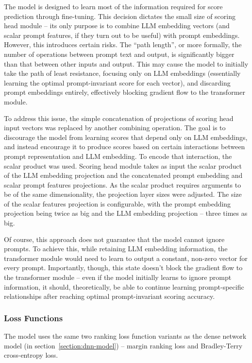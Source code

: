 \documentclass[a4paper,11pt,twoside]{report}
\theoremstyle{definition}
\begin{document}
The model is designed to learn most of the information required for score prediction through fine-tuning. This decision dictates the small size of scoring head module -- its only purpose is to combine LLM embedding vectors (and scalar prompt features, if they turn out to be useful) with prompt embeddings. However, this introduces certain risks. The ``path length'', or more formally, the number of operations between prompt text and output, is significantly bigger than that between other inputs and output. This may cause the model to initially take the path of least resistance, focusing only on LLM embeddings (essentially learning the optimal prompt-invariant score for each vector), and discarding prompt embeddings entirely, effectively blocking gradient flow to the transformer module.

To address this issue, the simple concatenation of projections of scoring head input vectors was replaced by another combining operation. The goal is to discourage the model from learning scores that depend only on LLM embeddings, and instead encourage it to produce scores based on certain interactions between prompt representation and LLM embedding. To encode that interaction, the scalar product was used. Scoring head module takes as input the scalar product of the LLM embedding projection and the concatenated prompt embedding and scalar prompt features projections. As the scalar product requires arguments to be of the same dimensionality, the projection layer sizes were adjusted. The size of the scalar features projection is configurable, with the prompt embedding projection being twice as big and the LLM embedding projection -- three times as big.

Of course, this approach does not guarantee that the model cannot ignore prompts. To achieve this, while retaining LLM embedding information, the transformer module would need to learn to output a constant, non-zero vector for every prompt. Importantly, though, this state doesn't block the gradient flow to the transformer module -- even if the model initially learns to ignore prompt information, it should, theoretically, be able to continue learning prompt-specific relationships after reaching optimal prompt-invariant scoring accuracy.

\subsubsection{Loss Functions}

The model uses the same two ranking loss function variants as the dense network model (in section~\ref{section:dnn-model}) -- margin ranking loss and Bradley-Terry cross-entropy loss.
\end{document}
